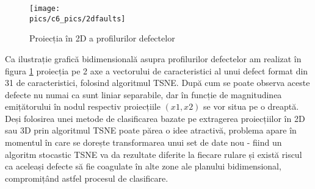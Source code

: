 \begin{figure}[H]
\centering
\texttt{[image: \\pics/c6\_pics/2dfaults]}
\caption{Proiecția în 2D a profilurilor defectelor}
\label{fig:tsne_faults}
\end{figure}

Ca ilustrație grafică bidimensională asupra profilurilor defectelor am realizat în figura \ref{fig:tsne_faults} proiecția pe 2 axe a vectorului de caracteristici al unui defect format din 31 de caracteristici, folosind algoritmul TSNE. După cum se poate observa aceste defecte nu numai ca sunt liniar separabile, dar în funcție de magnitudinea emițătorului în nodul respectiv proiecțiile $(x1, x2)$ se vor situa pe o dreaptă. Deși folosirea unei metode de clasificarea bazate pe extragerea proiecțiilor în 2D sau 3D prin algoritmul TSNE poate părea o idee atractivă, problema apare în momentul în care se dorește transformarea unui set de date nou - fiind un algoritm stocastic TSNE va da rezultate diferite la fiecare rulare și există riscul ca aceleași defecte să fie coagulate în alte zone ale planului bidimensional, compromițând astfel procesul de clasificare.



